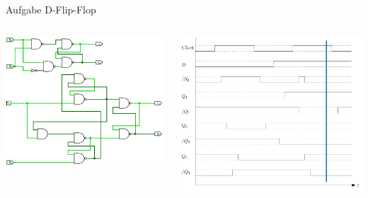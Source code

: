 \begin{frame}{Aufgabe \thesection}{D-Flip-Flop}
  \begin{solutionnoinc}
    \begin{columns}
      \begin{column}{0.5\textwidth}
        \includegraphics[height=0.5\paperheight, center]{./figures/comparison111.png}
      \end{column}
      \begin{column}{0.5\textwidth}
        \includegraphics[height=0.5\paperheight, center]{./figures/timing_diagram_5.png}
      \end{column}
    \end{columns}
  \end{solutionnoinc}
\end{frame}
